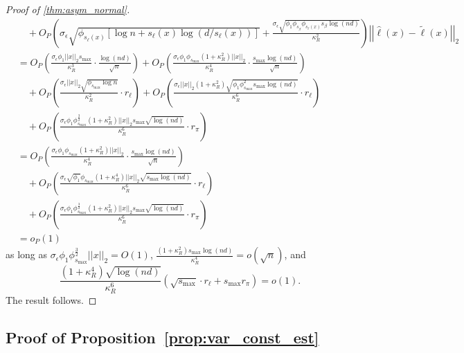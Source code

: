 \documentclass[ejsv2,noshowframe]{imsart}
\theoremstyle{plain}
\theoremstyle{definition}
\theoremstyle{remark}
\newcommand{\norm}[1]{\left|\left| #1 \right|\right|}
\renewcommand{\hat}{\widehat}
\renewcommand{\tilde}{\widetilde}
\begin{document}
\begin{proof}[Proof of \autoref{thm:asym_normal}]
\begin{align*}
		&\quad + O_P\left(\sigma_{\epsilon}\sqrt{\phi_{s_{\ell}(x)}\left[\log n + s_{\ell}(x) \log(d/s_{\ell}(x)) \right]} + \frac{\sigma_{\epsilon} \sqrt{\phi_1 \phi_{s_{\beta}} \phi_{s_{\ell}(x)} s_{\beta} \log(nd)}}{\kappa_R^2} \right) \norm{\hat{\ell}(x) - \tilde{\ell}(x)}_2\\
		&= O_P\left(\frac{\sigma_{\epsilon}\phi_1 \norm{x}_2 s_{\max}}{\kappa_R^3} \cdot \frac{\log(nd)}{\sqrt{n}} \right) + O_P\left(\frac{\sigma_{\epsilon}\phi_1 \phi_{s_{\max}}(1+\kappa_R^2)\norm{x}_2}{\kappa_R^4} \cdot \frac{s_{\max}\log(nd)}{\sqrt{n}}\right)\\
		&\quad + O_P\left(\frac{\sigma_{\epsilon}\norm{x}_2\sqrt{\phi_{s_{\max}} \log n}}{\kappa_R^2} \cdot r_{\ell} \right) + O_P\left(\frac{\sigma_{\epsilon}\norm{x}_2\left(1+\kappa_R^2 \right)\sqrt{\phi_1 \phi_{s_{\max}}^2 s_{\max} \log(nd)}}{\kappa_R^6} \cdot r_{\ell}\right)\\
		&\quad + O_P\left(\frac{\sigma_{\epsilon}\phi_1 \phi_{s_{\max}}^{\frac{3}{2}} \left(1+\kappa_R^2 \right) \norm{x}_2 s_{\max} \sqrt{\log(nd)}}{\kappa_R^6} \cdot r_{\pi}\right)\\
		&= O_P\left(\frac{\sigma_{\epsilon}\phi_1 \phi_{s_{\max}}(1 +\kappa_R^2)\norm{x}_2}{\kappa_R^4} \cdot \frac{s_{\max}\log(nd)}{\sqrt{n}}\right) \\
		&\quad + O_P\left(\frac{\sigma_{\epsilon}\sqrt{\phi_1} \phi_{s_{\max}}\left(1+ \kappa_R^4 \right) \norm{x}_2\sqrt{s_{\max} \log(nd)}}{\kappa_R^6} \cdot r_{\ell}\right)\\
		&\quad + O_P\left(\frac{\sigma_{\epsilon}\phi_1 \phi_{s_{\max}}^{\frac{3}{2}} \left(1+\kappa_R^2 \right) \norm{x}_2 s_{\max} \sqrt{\log(nd)}}{\kappa_R^6} \cdot r_{\pi}\right)\\
		&=o_P(1)
	\end{align*}
	as long as $\sigma_{\epsilon}\phi_1\phi_{s_{\max}}^{\frac{3}{2}}\norm{x}_2=O(1)$, $\frac{(1+\kappa_R^2)s_{\max}\log(nd)}{\kappa_R^4} = o\left(\sqrt{n}\right)$, and $$\frac{(1+\kappa_R^4)\sqrt{\log(nd)}}{\kappa_R^6}\left(\sqrt{s_{\max}}\cdot r_{\ell} +s_{\max}r_{\pi}\right) =o(1).$$ 
	The result follows.
\end{proof}


\subsection{Proof of Proposition~\ref{prop:var_const_est}}
\label{subapp:proof_var_const_est}
\end{document}
